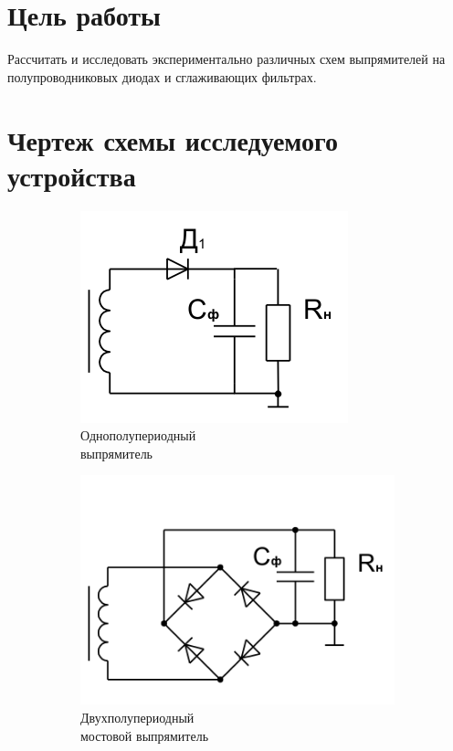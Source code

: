 





\section{Цель работы}

Рассчитать и исследовать экспериментально различных схем выпрямителей на полупроводниковых диодах и сглаживающих фильтрах.

\section{Чертеж схемы исследуемого устройства}
\begin{figure}[h]
	\centering
	\vspace{-0.5cm}
	\begin{subfigure}[b]{0.35\textwidth}
		\includegraphics[scale=0.75]{img/diod.png}
		\caption{Однополупериодный \\выпрямитель}\label{figure:2.1:a}
	\end{subfigure}
	\begin{subfigure}[b]{0.35\textwidth}
		\includegraphics[scale=0.40]{img/4diods.png}
		\caption{Двухполупериодный \\мостовой выпрямитель}\label{figure:2.1:b}
	\end{subfigure}
	\caption{}
\end{figure}

